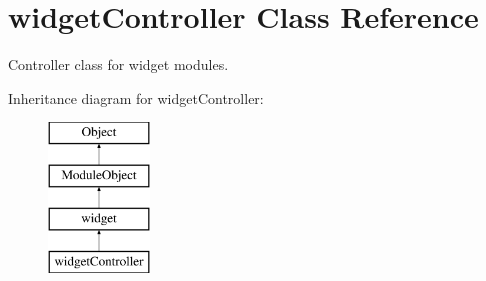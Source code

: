 \hypertarget{classwidgetController}{\section{widget\+Controller Class Reference}
\label{classwidgetController}
}


Controller class for widget modules.  


Inheritance diagram for widget\+Controller\+:\begin{figure}[H]
\begin{center}
\leavevmode
\includegraphics[height=4.000000cm]{classwidgetController}
\end{center}
\end{figure}
